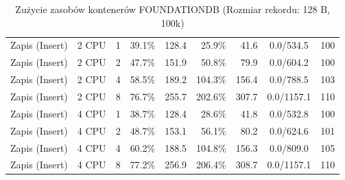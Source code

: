 \begin{table}[ht]
{\begin{tabular}{llcrrrrcc}
Zapis (Insert) & 2 CPU & 1 & 39.1\% & 128.4 & 25.9\% & 41.6 & 0.0/534.5 & 100 \\
Zapis (Insert) & 2 CPU & 2 & 47.7\% & 151.9 & 50.8\% & 79.9 & 0.0/604.2 & 100 \\
Zapis (Insert) & 2 CPU & 4 & 58.5\% & 189.2 & 104.3\% & 156.4 & 0.0/788.5 & 103 \\
Zapis (Insert) & 2 CPU & 8 & 76.7\% & 255.7 & 202.6\% & 307.7 & 0.0/1157.1 & 110 \\
Zapis (Insert) & 4 CPU & 1 & 38.7\% & 128.4 & 28.6\% & 41.8 & 0.0/532.8 & 100 \\
Zapis (Insert) & 4 CPU & 2 & 48.7\% & 153.1 & 56.1\% & 80.2 & 0.0/624.6 & 101 \\
Zapis (Insert) & 4 CPU & 4 & 60.2\% & 188.5 & 104.8\% & 156.3 & 0.0/809.0 & 105 \\
Zapis (Insert) & 4 CPU & 8 & 77.2\% & 256.9 & 206.4\% & 308.7 & 0.0/1157.1 & 110 \\
\bottomrule
\end{tabular}%
}
\caption{Zużycie zasobów kontenerów FOUNDATIONDB (Rozmiar rekordu: 128 B, 100k)}
\label{tab:resources_foundationdb_small_100000}
\end{table}
